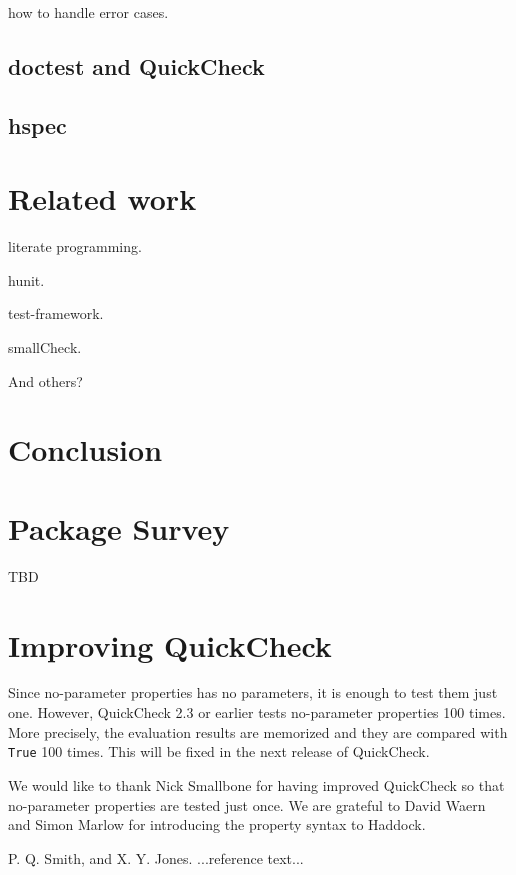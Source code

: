 \documentclass[preprint]{sigplanconf}
\begin{document}
how to handle error cases.

\subsection{doctest and QuickCheck}

\subsection{hspec}

\section{Related work}

literate programming.

hunit.

test-framework.

smallCheck.

And others?

\section{Conclusion}

\appendix

\section{Package Survey}

TBD

\section{Improving QuickCheck}

Since no-parameter properties has no parameters, it is enough to test them
just one.
However, QuickCheck 2.3 or earlier tests no-parameter properties 100 times.
More precisely, the evaluation results are memorized and they are
compared with {\tt True} 100 times.
This will be fixed in the next release of QuickCheck.


\acks

We would like to thank
Nick Smallbone for having improved QuickCheck so that no-parameter properties are tested just once.
We are grateful to David Waern and Simon Marlow
for introducing the property syntax to Haddock.






\begin{thebibliography}{}
\softraggedright

P. Q. Smith, and X. Y. Jones. ...reference text...

\end{thebibliography}
\end{document}
